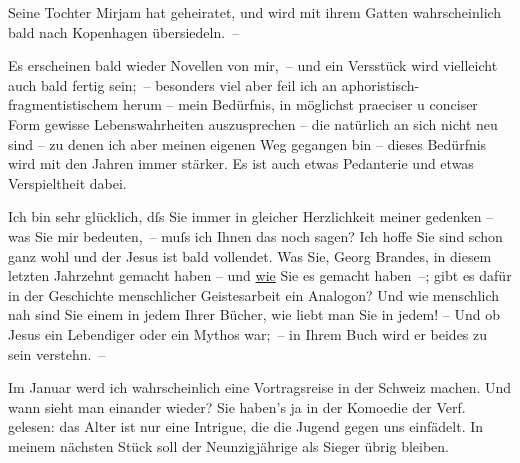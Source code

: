                Seine Tochter Mirjam hat geheiratet, und wird
               mit ihrem Gatten
               wahrscheinlich bald nach Kopenhagen
               übersiedeln. –\pend
           
\pstart
           Es erscheinen bald wieder Novellen von mir, – und ein Versstück wird vielleicht auch bald fertig sein; –
               besonders viel aber feil ich an aphoristisch-fragmentistischem herum – mein
               Bedürfnis, in möglichst  praeciser u conciser
               Form gewisse Lebenswahrheiten auszusprechen – die natürlich an sich nicht neu sind –
               zu denen ich aber meinen eigenen Weg gegangen bin – dieses Bedürfnis wird mit den
               Jahren immer stärker. Es ist auch etwas Pedanterie und etwas Verspieltheit dabei.\pend
           
\pstart
           Ich bin sehr glücklich, dſs Sie immer in gleicher Herzlichkeit meiner gedenken – was
               Sie mir bedeuten, – muſs ich Ihnen das noch sagen? Ich hoffe Sie sind schon ganz wohl
               und der Jesus ist bald vollendet. Was Sie, Georg Brandes, {\pb}in diesem letzten Jahrzehnt gemacht haben – und \uline{wie}
               Sie es gemacht haben –; gibt es dafür in der Geschichte menschlicher Geistesarbeit
               ein Analogon? Und wie menschlich nah sind Sie einem \introOben{}in\introOben{} jedem
               Ihrer Bücher, wie liebt man Sie in jedem! – Und ob Jesus ein Lebendiger oder ein Mythos war; – in Ihrem Buch wird er beides zu sein verstehn. –\pend
           
\pstart
           Im Januar werd ich wahrscheinlich eine Vortragsreise in der Schweiz machen. Und wann sieht man einander
               wieder? Sie haben's ja in der Komoedie der Verf.
               gelesen: das Alter ist nur eine Intrigue, die die Jugend gegen uns einfädelt. In
               meinem nächsten Stück soll der
               Neunzigjährige als Sieger übrig bleiben.\pend
           

